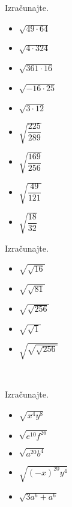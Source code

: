         \begin{multicols}{2}
            

            \begin{naloga}
                Izračunajte.
                \begin{itemize}
                        \item $\sqrt{49\cdot 64}$ 
                        \item $\sqrt{4\cdot 324}$ 
                        \item $\sqrt{361\cdot 16}$ 
                        \item $\sqrt{-16\cdot 25}$ 
                        \item $\sqrt{3\cdot 12}$ 
                        \item $\sqrt{\dfrac{225}{289}}$ 
                        \item $\sqrt{\dfrac{169}{256}}$ 
                        \item $\sqrt{\dfrac{49}{121}}$ 
                        \item $\sqrt{\dfrac{18}{32}}$ 
                \end{itemize}
            \end{naloga}
        

        
            \begin{naloga}
                Izračunajte.
                \begin{itemize}
                        \item $\sqrt{\sqrt{16}}$ 
                        \item $\sqrt{\sqrt{81}}$ 
                        \item $\sqrt{\sqrt{256}}$ 
                        \item $\sqrt{\sqrt{1}}$ 
                        \item $\sqrt{\sqrt{\sqrt{256}}}$ 
                \end{itemize}
            \end{naloga}
        
            ~~
        
            \begin{naloga}
                Izračunajte.
                \begin{itemize}
                        \item $\sqrt{x^4y^8}$ 
                        \item $\sqrt{e^{10}f^{26}}$ 
                        \item $\sqrt{a^{20}b^4}$ 
                        \item $\sqrt{(-x)^{20}y^4}$ 
                        \item $\sqrt{3a^6+a^6}$ 
                \end{itemize}
            \end{naloga}
        



\end{multicols}
